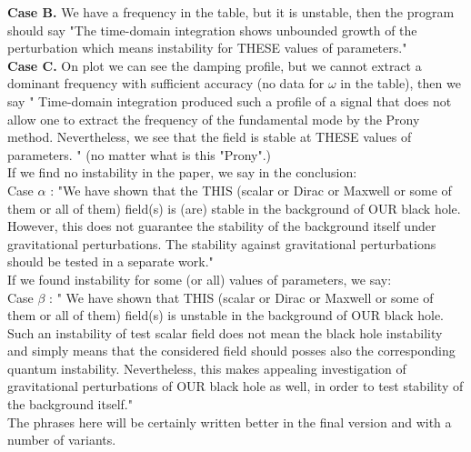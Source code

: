\documentclass[10pt]{article}
\begin{document}
\textbf{Case B.} We have a frequency in the table, but it is unstable, then the program should say "The time-domain integration shows unbounded growth of the perturbation which means instability for THESE values of parameters." \\

\textbf{Case C.} On plot we can see the damping profile, but we cannot extract a dominant frequency with sufficient accuracy (no data for $\omega$ in the table), then we say " Time-domain integration produced such a profile of a signal that does not allow one to extract the frequency of the fundamental mode by the Prony method. Nevertheless, we see that the field is stable at THESE values of parameters. " (no matter what is this "Prony".)\\


If we find no instability in the paper, we say in the conclusion:\\

Case $\alpha$ :  "We have shown that the THIS (scalar or Dirac or Maxwell or some of them or all of them) field(s) is (are) stable in the background of OUR black hole. However, this does not guarantee the stability of the background itself under gravitational perturbations. The stability against gravitational perturbations should be tested in a separate work."\\

If we found instability for some (or all) values of parameters, we say: \\

Case $\beta$ : " We have shown that THIS (scalar or Dirac or Maxwell or some of them or all of them) field(s) is unstable in the background of OUR black hole. Such an instability of test scalar field does not mean the black hole instability and simply means that the considered field should posses also the corresponding quantum instability. Nevertheless, this makes appealing investigation of gravitational perturbations of OUR black hole as well, in order to test stability of the background itself."\\


The phrases here will be certainly written better in the final version and with a number of variants.




 
 
\end{document}
